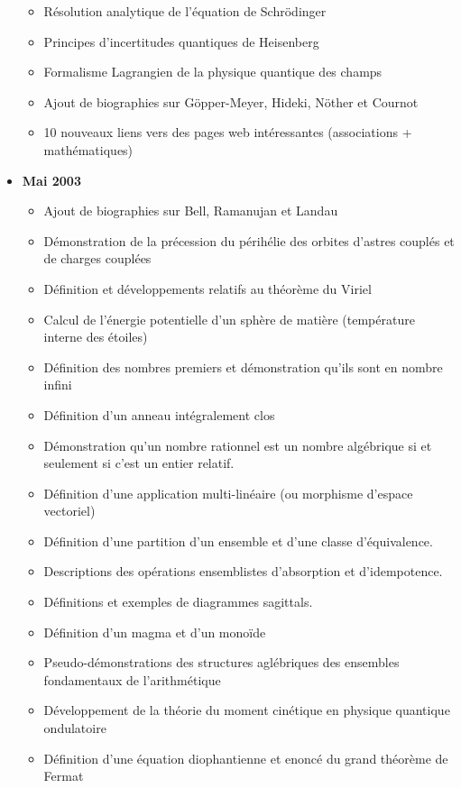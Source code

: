\begin{itemize}
\begin{itemize}[noitemsep]
				\item Résolution analytique de l'équation de Schrödinger
				\item Principes d'incertitudes quantiques de Heisenberg
				\item Formalisme Lagrangien de la physique quantique des champs
				\item Ajout de biographies sur Göpper-Meyer, Hideki, Nöther et Cournot 
				\item 10 nouveaux liens vers des pages web intéressantes (associations + mathématiques)
			\end{itemize}
		\item \textbf{Mai 2003}
			\begin{itemize}[noitemsep]
				\item Ajout de biographies sur Bell, Ramanujan et Landau 
				\item Démonstration de la précession du périhélie des orbites d'astres couplés et de charges couplées
				\item Définition et développements relatifs au théorème du Viriel
				\item Calcul de l'énergie potentielle d'un sphère de matière (température interne des étoiles)
				\item Définition des nombres premiers et démonstration qu'ils sont en nombre infini 
				\item Définition d'un anneau intégralement clos
				\item Démonstration qu'un nombre rationnel est un nombre algébrique si et seulement si c'est un entier relatif. 
				\item Définition d'une application multi-linéaire (ou morphisme d'espace vectoriel) 
				\item Définition d'une partition d'un ensemble et d'une classe d'équivalence. 
				\item Descriptions des opérations ensemblistes d'absorption et d'idempotence. 
				\item Définitions et exemples de diagrammes sagittals.
				\item Définition d'un magma et d'un monoïde
				\item Pseudo-démonstrations des structures aglébriques des ensembles fondamentaux de l'arithmétique
				\item Développement de la théorie du moment cinétique en physique quantique ondulatoire
				\item Définition d'une équation diophantienne et enoncé du grand théorème de Fermat
			\end{itemize}

\end{itemize}
